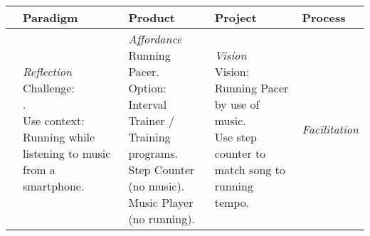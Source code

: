 \begin{table}
\begin{tabular}{l|l|l|l|l}
         & \textbf{Paradigm} & \textbf{Product} & \textbf{Project} & \textbf{Process} \\ \hline
\parbox[t][4cm][c]{0.02\textwidth}{} %
	& \parbox[t]{0.20\textwidth}{\small 
		\textit{Reflection} \newline
		Challenge: \newline
		. \newline
		Use context: \newline
		Running while listening to music from a smartphone.
	}
	& \parbox[t]{0.20\textwidth}{\small 
		\textit{Affordance} \newline
		Running Pacer. \newline
		Option: \newline
		Interval Trainer / Training programs. \newline
		Step Counter (no music). \newline
		Music Player (no running). \newline
	}
	& \parbox[t]{0.20\textwidth}{\small  
		\textit{Vision} \newline
		Vision: \newline
		Running Pacer by use of music. \newline
		Use step counter to match song to running tempo.
	}
    & \parbox[t]{0.20\textwidth}{\small 
	    \textit{Facilitation} \newline
	    
}
\end{tabular}
\end{table}
